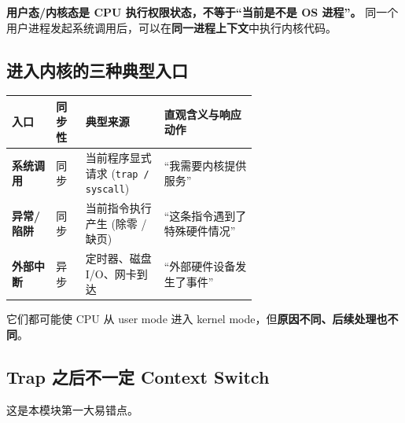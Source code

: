 \documentclass[11pt,a4paper]{ctexart}
\newcommand{\kw}[1]{\textbf{#1}}
\newcommand{\code}[1]{\texttt{#1}}
\begin{document}
\begin{corebox}[关键理解]
\kw{用户态/内核态是 CPU 执行权限状态，不等于“当前是不是 OS 进程”。} 同一个用户进程发起系统调用后，可以在\kw{同一进程上下文}中执行内核代码。
\end{corebox}

\subsection{进入内核的三种典型入口}

\begingroup
\small
\renewcommand{\arraystretch}{1.25}
\setlength{\tabcolsep}{5pt}
\begin{tabularx}{\linewidth}{>{\bfseries}p{0.18\linewidth} p{0.12\linewidth} p{0.32\linewidth} X}
\toprule
入口 & 同步性 & 典型来源 & 直观含义与响应动作\\
\midrule
系统调用 & 同步 & 当前程序显式请求 (\code{trap / syscall}) & “我需要内核提供服务”\\
异常/陷阱 & 同步 & 当前指令执行产生 (除零 / 缺页) & “这条指令遇到了特殊硬件情况”\\
外部中断 & 异步 & 定时器、磁盘 I/O、网卡到达 & “外部硬件设备发生了事件”\\
\bottomrule
\end{tabularx}
\endgroup

它们都可能使 CPU 从 user mode 进入 kernel mode，但\kw{原因不同、后续处理也不同}。

\subsection{Trap 之后不一定 Context Switch}

这是本模块第一大易错点。

\begin{center}
\begingroup
\small
{}
\endgroup
\end{center}
\end{document}
